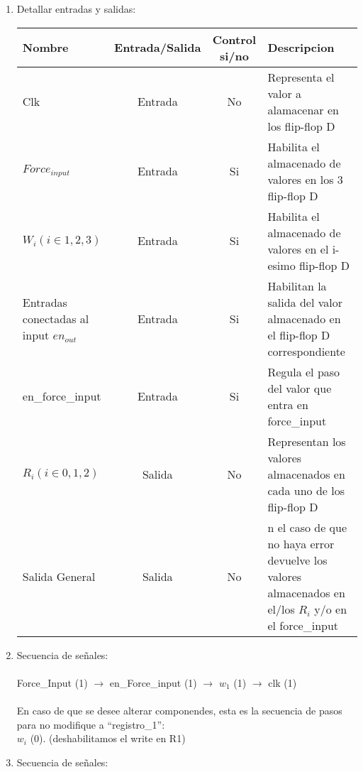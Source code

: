 \documentclass{article}
\begin{document}
\begin{enumerate}
    \item Detallar entradas y salidas:
    \begin{center}{\renewcommand{\arraystretch}{1.5}
        \begin{tabular}{p{3.5cm} | c | c |p{9cm} }
            Nombre &Entrada/Salida & Control si/no & Descripcion \\ \hline
            Clk & Entrada & No & Representa el valor a alamacenar en los flip-flop D\\
            $Force_{input}$ & Entrada & Si & Habilita el almacenado de valores en los 3 flip-flop D\\
            $W_i (i\in 1,2,3)$ & Entrada & Si & Habilita el almacenado de valores en el i-esimo flip-flop D\\
            Entradas conectadas al input $en_{out}$ & Entrada & Si & Habilitan la salida del valor almacenado en el flip-flop D correspondiente\\
            en\_force\_input & Entrada & Si & Regula el paso del valor que entra en force\_input \\
            $R_i (i\in 0,1,2)$ & Salida & No & Representan los valores almacenados en cada uno de los flip-flop D\\
            Salida General & Salida & No & n el caso de que no haya error devuelve los valores almacenados en el/los $R_i$ y/o en el force\_input\\
        \end{tabular}}
    \end{center}
    \item Secuencia de señales:\\\\
    Force\_Input (1) $\rightarrow$ en\_Force\_input (1) $\rightarrow$  $w_1$ (1) $\rightarrow$ clk (1)\\\\

    En caso de que se desee alterar componendes, esta es la secuencia de pasos para no modifique a “registro\_1”:\\
    $w_i$ (0). (deshabilitamos el write en R1)

    \item Secuencia de señales:\\\\
    

\end{enumerate}
\end{document}
